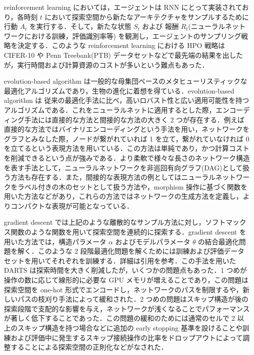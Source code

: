 \documentclass[twocolumn]{ujarticle}   %
\begin{document}
	reinforcement learning においては，エージェントは RNN にとって実装されており，各時刻 $t$ において探索空間から新たなアーキテクチャをサンプルするために 行動 $A_{t}$ を実行する．そして，新たな状態 $S_{t}$ および 報酬 $R_{t}$(ニューラルネットワークにおける訓練，評価識別率等) を観測し，エージェントのサンプリング戦略を決定する．このような reinforcement learning における HPO 戦略は CIFER-10 や Penn Treebank(PTB) データセットなどで最先端の結果を出したが，実行時間および計算資源のコストが多いという難点もあった．

	evolution-based algorithm は一般的な母集団ベースのメタヒューリスティックな最適化アルゴリズムであり，生物の進化に着想を得ている．evolution-based algorithm は 従来の最適化手法に比べ，高いロバスト性と広い適用可能性を持つアルゴリズムである．これをニューラルネットに適用するとした際，エンコーディング手法には直接的な方法と間接的な方法の大きく 2 つが存在する．例えば直接的な方法ではバイナリエンコーディングという手法を用い，ネットワークをグラフとみなした際，ノードが繋がれていれば 1 を立て，繋がれていなければ 0 を立てるという表現方法を用いている．この方法は単純であり，かつ計算コストを削減できるという点が強みである．より柔軟で様々な長さのネットワーク構造を表す手法として，ニューラルネットワークを非巡回有向グラフ(DAG)として扱う方法も存在する．また，間接的な表現方法の例としてはニューラルネットワークをラベル付きの木のセットとして扱う方法や，morphism 操作に基づく関数を用いた方法などがあり，これらの方法ではネットワークの生成方法を定義し，よりコンパクトな表現が可能となっている．

	gradient descent では上記のような離散的なサンプル方法に対し，ソフトマックス関数のような関数を用いて探索空間を連続的に探索する．gradient descent を用いた方法では，構造パラメータ $\alpha$ およびモデルパラメータ $\theta$ の結合最適化問題を解く．このような 2 段階最適化問題を解くためには訓練および評価データセットを用いてそれぞれを訓練する．詳細は引用を参考．この手法を用いた DARTS は探索時間を大きく削減したが，いくつかの問題点もあった．1 つめが操作の数に応じて線形的に必要な GPU メモリが増えることであり，この問題は探索空間を one-hot 形式でエンコードし，ネットワークのパスを制限するや，新しいパスの枝刈り手法によって緩和された．2 つめの問題はスキップ構造が後の探索段階で支配的な影響を与え，ネットワークが浅くなることでパフォーマンスが著しく低下することであった．この問題の緩和のためには通常のセルで 2 以上のスキップ構造を持つ場合などに追加の early stopping 基準を設けることや訓練および評価中に発生するスキップ接続操作の比率をドロップアウトによって調整することによる探索空間の正則化などがなされた．
\end{document}
